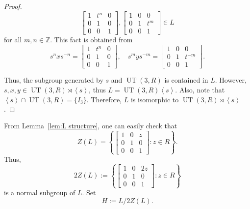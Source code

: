\documentclass[11pt]{amsart}
\theoremstyle{definition}
\DeclareMathOperator{\UT}{UT}
\newcommand{\ZZ}{\mathbb{Z}}
\begin{document}
\begin{proof}
 $$ \begin{bmatrix} 1 & t^n & 0 \\ 0 & 1 & 0 \\ 0 & 0 & 1 
 \end{bmatrix}, \begin{bmatrix} 1 & 0 & 0 \\ 0 & 1 & t^m \\ 0 & 0 & 1 
 \end{bmatrix} \in L$$
 for all $m,n \in \ZZ$.
 This fact is obtained from
 $$ s^nxs^{-n}=\begin{bmatrix} 1 & t^n & 0 \\ 0 & 1 & 0 \\ 0 & 0 & 1 
 \end{bmatrix}, \quad s^mys^{-m}=\begin{bmatrix} 1 & 0 & 0 \\ 0 & 1 & t^{-m} \\ 0 & 0 & 1 
 \end{bmatrix}.$$
 
 Thus, the subgroup generated by $s$ and $\UT(3,R)$ is contained in $L$.
 However, $s,x,y \in \UT(3,R) \rtimes \left< s \right>$, thus $L=\UT(3,R) \left< s \right>$.
 Also, note that $\left< s \right> \cap \UT(3,R)=\{ I_3 \}$.
 Therefore, $L$ is isomorphic to $\UT(3,R) \rtimes \left< s \right>$.
\end{proof}
 
 From Lemma~\ref{lem:L structure}, one can easily check that
 $$ Z(L)=\left \{  \begin{bmatrix}
 1 & 0 & z \\ 0 & 1 & 0 \\ 0 & 0 & 1
 \end{bmatrix} : z \in R \right \}. $$
 Thus, $$ 2Z(L):= \left \{  \begin{bmatrix}
 1 & 0 & 2z \\ 0 & 1 & 0 \\ 0 & 0 & 1
 \end{bmatrix} : z \in R \right \} $$ is a normal subgroup of $L$.
 Set 
 $$ H:=L/2Z(L). $$
\end{document}
